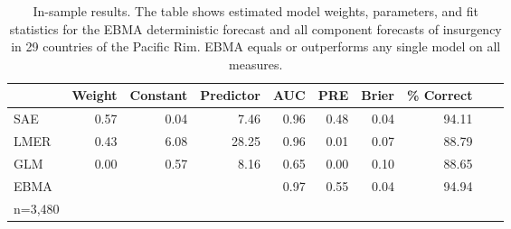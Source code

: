 \begin{table}[h!]
\small
\begin{center}
  \caption{\footnotesize In-sample results.  The table shows estimated
    model weights, parameters, and fit statistics for the EBMA
    deterministic forecast and all component forecasts of insurgency
    in 29 countries of the Pacific Rim.  EBMA equals or outperforms
    any single model on all measures.}\label{InSam1}
\begin{tabular}{lrrrrrrrrr}
  \toprule
 & Weight & Constant & Predictor & AUC & PRE & Brier & \% Correct \\ 
  \midrule
  SAE & 0.57 & 0.04 & 7.46 & 0.96 & 0.48 & 0.04 & 94.11\\ 
  LMER & 0.43 & 6.08 & 28.25 & 0.96 & 0.01 & 0.07 & 88.79\\ 
  GLM & 0.00 & 0.57 & 8.16 & 0.65 & 0.00 & 0.10 & 88.65\\ 
  EBMA &  &  &  & 0.97 & 0.55 & 0.04 & 94.94\\ 
   \bottomrule
n=3,480\\
\end{tabular}
\end{center}
\end{table}


